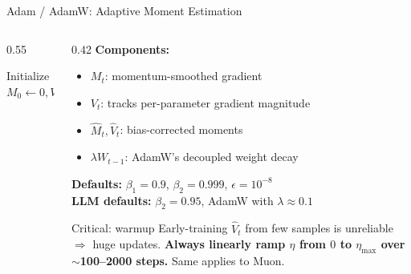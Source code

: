 \begin{frame}{Adam / AdamW: Adaptive Moment Estimation~\cite{kingma2015adam, loshchilov2019adamw}}

  \begin{columns}[T]
    \begin{column}{0.55\textwidth}
      \begin{algorithm}[H]
        \small
        \caption{Adam / AdamW}
        Initialize $M_0 \gets 0, V_0 \gets 0$\;
      \end{algorithm}
    \end{column}
    \begin{column}{0.42\textwidth}
      \textbf{Components:}
      \begin{itemize}
        \item $M_t$: momentum-smoothed gradient
        \item $V_t$: tracks per-parameter gradient magnitude
        \item $\hat{M}_t, \hat{V}_t$: bias-corrected moments
        \item \textcolor{slide_violet}{$\lambda W_{t-1}$}: AdamW's decoupled weight decay
      \end{itemize}

      \vspace{0.3em}
      \textbf{Defaults:} $\beta_1 {=} 0.9$, $\beta_2 {=} 0.999$, $\epsilon {=} 10^{-8}$\\
      \textbf{LLM defaults:} $\beta_2 {=} 0.95$, AdamW with $\lambda {\approx} 0.1$

      \vspace{0.4em}
      \begin{alertblock}{Critical: warmup}
        Early-training $\hat{V}_t$ from few samples is unreliable $\Rightarrow$ huge updates. \textbf{Always linearly ramp $\eta$ from $0$ to $\eta_{\max}$ over $\sim$100--2000 steps.} Same applies to Muon.
      \end{alertblock}
    \end{column}
  \end{columns}

\end{frame}

